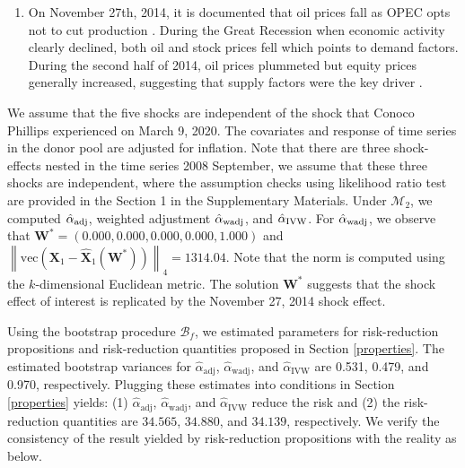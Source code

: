 \documentclass[11pt]{article}
\def\mbf#1{\mathbf{#1}} %
\def\mrm#1{\mathrm{#1}} %
\def\mc#1{\mathcal{#1}} %
\newcommand{\norm}[1]{\left\lVert#1\right\rVert} %
\theoremstyle{definition}
\begin{document}
\begin{enumerate}
\begin{enumerate}
  \item On November 27th, 2014, it is documented that oil prices fall as OPEC opts not to cut production \citep{huppmann2015opec}. During the Great Recession when economic activity clearly declined, both oil and stock prices fell which points to demand factors. During the second half of 2014, oil prices plummeted but equity prices generally increased, suggesting that supply factors were the key driver \citep[Page 19]{baffes2015great}. 
  \end{enumerate}
\end{enumerate}


We assume that the five shocks are independent of the shock that Conoco Phillips experienced on March 9, 2020. The covariates and response of time series in the donor pool are adjusted for inflation. Note that there are three shock-effects nested in the time series 2008 September, we assume that these three shocks are independent, where the assumption checks using likelihood ratio test are provided in the Section 1 in the Supplementary Materials. Under $\mc{M}_{2}$, we computed $\hat{\alpha}_{\rm adj}$, weighted adjustment $\hat{\alpha}_{\rm wadj}$, and $\hat{\alpha}_{\rm IVW}$. For $\hat{\alpha}_{\rm wadj}$, we observe that 
$
  \mathbf{W}^*= (0.000,0.000, 0.000, 0.000, 1.000)
$
and 
$
  \norm{\mrm{vec}\left(\mbf{X}_1-\hat{\mbf{X}}_1(\mbf{W}^*)\right)}_{4} = 1314.04.
$
Note that the norm is computed using the $k$-dimensional Euclidean metric. The solution $\mathbf{W}^*$ suggests that the shock effect of interest is replicated by the November 27, 2014 shock effect. 


Using the bootstrap procedure $\mc{B}_f$, we estimated parameters for risk-reduction propositions and risk-reduction quantities proposed in  Section \ref{properties}. The estimated bootstrap variances for $\hat{\alpha}_{\text{adj}}$, $\hat{\alpha}_{\text{wadj}}$, and $\hat{\alpha}_{\text{IVW}}$  are 0.531, 0.479, and 0.970, respectively. Plugging these estimates into conditions in Section \ref{properties} yields: (1) $\hat{\alpha}_{\text{adj}}$, $\hat{\alpha}_{\text{wadj}}$, and $\hat{\alpha}_{\text{IVW}}$  reduce the risk and (2) the risk-reduction quantities are $34.565$, $34.880$, and $34.139$, respectively. We verify the consistency of the result yielded by risk-reduction propositions with the reality as below.
\end{document}
